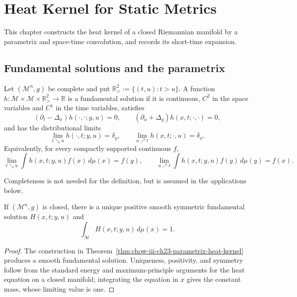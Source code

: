 \chapter{Heat Kernel for Static Metrics}
\label{chow-iii-ch23-heat-kernel-static-metrics}

This chapter constructs the heat kernel of a closed Riemannian manifold by a
parametrix and space-time convolution, and records its short-time expansion.

\section{Fundamental solutions and the parametrix}

\begin{definition}
\label{def:chow-iii-ch23-fundamental-solution}
Let $(\mathcal M^n,g)$ be complete and put
\(\mathbb R^2_>:=\{(t,u):t>u\}\).  A function
\(h:\mathcal M\times\mathcal M\times\mathbb R^2_>\to\mathbb R\) is a
fundamental solution if it is continuous, $C^2$ in the space variables and
$C^1$ in the time variables, satisfies
\[
(\partial_t-\Delta_x)h(\cdot,\cdot;y,u)=0,
\qquad (\partial_u+\Delta_y)h(x,t;\cdot,\cdot)=0,
\]
and has the distributional limits
\[
\lim_{t\searrow u}h(\cdot,t;y,u)=\delta_y,
\qquad \lim_{u\nearrow t}h(x,t;\cdot,u)=\delta_x.
\]
Equivalently, for every compactly supported continuous $f$,
\[
\lim_{t\searrow u}\int h(x,t;y,u)f(x)\,d\mu(x)=f(y),\qquad
\lim_{u\nearrow t}\int h(x,t;y,u)f(y)\,d\mu(y)=f(x).
\]
\end{definition}

\begin{remark}[Completeness]
\label{rem:chow-iii-ch23-completeness}
Completeness is not needed for the definition, but is assumed in the
applications below.
\end{remark}

\begin{theorem}
\label{thm:chow-iii-ch23-closed-heat-kernel}
If $(\mathcal M^n,g)$ is closed, there is a unique positive smooth symmetric
fundamental solution $H(x,t;y,u)$ and
\[
\int_{\mathcal M}H(x,t;y,u)\,d\mu(x)=1.
\]
\end{theorem}
\begin{proof}
The construction in Theorem~\ref{thm:chow-iii-ch23-parametrix-heat-kernel}
produces a smooth fundamental solution.  Uniqueness, positivity, and symmetry
follow from the standard energy and maximum-principle arguments for the heat
equation on a closed manifold; integrating the equation in $x$ gives the
constant mass, whose limiting value is one.
\end{proof}

